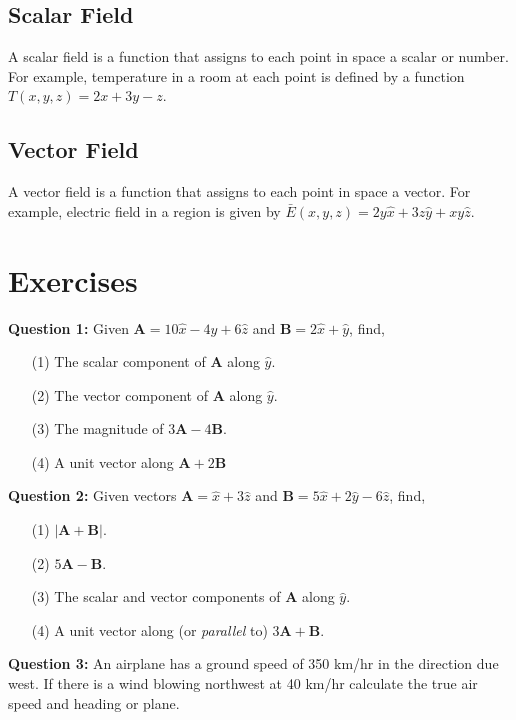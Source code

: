 \documentclass[12pt,a4paper]{article}
\begin{document}
\subsection{Scalar Field}
A scalar field is a function that assigns to each point in space a scalar or number. For example, temperature in a room at each point is defined by a function $T(x, y, z)=2x+3y-z$.
\subsection{Vector Field}
A vector field is a function that assigns to each point in space a vector. For example, electric field in a region is given by $\bar{E}(x, y, z)=2y\hat{x}+3z\hat{y}+xy\hat{z}$.
\section{Exercises}
\noindent\textbf{Question 1:} Given $\textbf{A}=10\hat x-4\hat y+6\hat z$ and $\textbf{B}=2\hat x+\hat y$, find,
\begin{enumerate}
\item[(1)] The scalar component of \textbf{A} along $\hat y$.
\item[(2)] The vector component of \textbf{A} along $\hat y$.
\item[(3)] The magnitude of $3\textbf{A}-4\textbf{B}$.
\item[(4)] A unit vector along $\textbf{A}+2\textbf{B}$
\end{enumerate}
\noindent\textbf{Question 2:} Given vectors $\textbf{A}=\hat x+3\hat z$ and $\textbf{B}=5\hat x+2\hat y-6\hat z$, find,
\begin{enumerate}
\item[(1)] $|\textbf{A}+\textbf{B}|$.
\item[(2)] $5\textbf{A}-\textbf{B}$.
\item[(3)] The scalar and vector components of \textbf{A} along $\hat y$.
\item[(4)] A unit vector along (or \textit{parallel} to) $3\textbf{A}+\textbf{B}$.
\end{enumerate}
\noindent\textbf{Question 3:} An airplane has a ground speed of 350 km/hr in the direction due west. If there is a wind blowing northwest at 40 km/hr calculate the true air speed and heading or plane.


\end{document}
